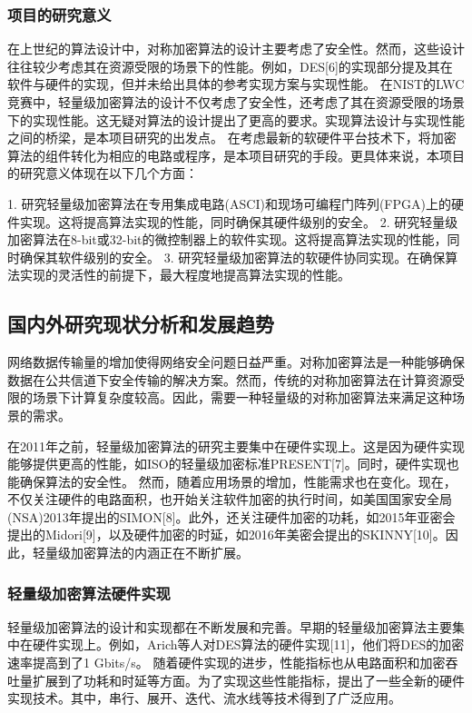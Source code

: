 \documentclass{ctexart}
\begin{document}
\subsubsection{项目的研究意义}
在上世纪的算法设计中，对称加密算法的设计主要考虑了安全性。然而，这些设计往往较少考虑其在资源受限的场景下的性能。例如，DES[6]的实现部分提及其在软件与硬件的实现，但并未给出具体的参考实现方案与实现性能。
在NIST的LWC竞赛中，轻量级加密算法的设计不仅考虑了安全性，还考虑了其在资源受限的场景下的实现性能。这无疑对算法的设计提出了更高的要求。实现算法设计与实现性能之间的桥梁，是本项目研究的出发点。
在考虑最新的软硬件平台技术下，将加密算法的组件转化为相应的电路或程序，是本项目研究的手段。更具体来说，本项目的研究意义体现在以下几个方面：

1. 研究轻量级加密算法在专用集成电路(ASCI)和现场可编程门阵列(FPGA)上的硬件实现。这将提高算法实现的性能，同时确保其硬件级别的安全。
2. 研究轻量级加密算法在8-bit或32-bit的微控制器上的软件实现。这将提高算法实现的性能，同时确保其软件级别的安全。
3. 研究轻量级加密算法的软硬件协同实现。在确保算法实现的灵活性的前提下，最大程度地提高算法实现的性能。


\subsection{国内外研究现状分析和发展趋势}

网络数据传输量的增加使得网络安全问题日益严重。对称加密算法是一种能够确保数据在公共信道下安全传输的解决方案。然而，传统的对称加密算法在计算资源受限的场景下计算复杂度较高。因此，需要一种轻量级的对称加密算法来满足这种场景的需求。

在2011年之前，轻量级加密算法的研究主要集中在硬件实现上。这是因为硬件实现能够提供更高的性能，如ISO的轻量级加密标准PRESENT[7]。同时，硬件实现也能确保算法的安全性。
然而，随着应用场景的增加，性能需求也在变化。现在，不仅关注硬件的电路面积，也开始关注软件加密的执行时间，如美国国家安全局(NSA)2013年提出的SIMON[8]。此外，还关注硬件加密的功耗，如2015年亚密会提出的Midori[9]，以及硬件加密的时延，如2016年美密会提出的SKINNY[10]。因此，轻量级加密算法的内涵正在不断扩展。
\subsubsection{轻量级加密算法硬件实现}
轻量级加密算法的设计和实现都在不断发展和完善。早期的轻量级加密算法主要集中在硬件实现上。例如，Arich等人对DES算法的硬件实现[11]，他们将DES的加密速率提高到了1 Gbits/s。
随着硬件实现的进步，性能指标也从电路面积和加密吞吐量扩展到了功耗和时延等方面。为了实现这些性能指标，提出了一些全新的硬件实现技术。其中，串行、展开、迭代、流水线等技术得到了广泛应用。
\end{document}
